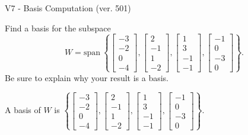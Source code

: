 \begin{exercise}
  \begin{exerciseTitle}V7 - Basis Computation (ver. 501)\end{exerciseTitle}
  \begin{exerciseStatement}
    Find a basis for the subspace 
\[W=\mathrm{span}\ \left\{\left[\begin{array}{r}
-3 \\
-2 \\
0 \\
-4
\end{array}\right] , \left[\begin{array}{r}
2 \\
-1 \\
1 \\
-2
\end{array}\right] , \left[\begin{array}{r}
1 \\
3 \\
-1 \\
-1
\end{array}\right] , \left[\begin{array}{r}
-1 \\
0 \\
-3 \\
0
\end{array}\right]\right\}.\]
 Be sure to explain why your result is a basis.


  \end{exerciseStatement}
  \begin{exerciseAnswer}
   A basis of \(W\) is  \(\left\{\left[\begin{array}{r}
-3 \\
-2 \\
0 \\
-4
\end{array}\right] , \left[\begin{array}{r}
2 \\
-1 \\
1 \\
-2
\end{array}\right] , \left[\begin{array}{r}
1 \\
3 \\
-1 \\
-1
\end{array}\right] , \left[\begin{array}{r}
-1 \\
0 \\
-3 \\
0
\end{array}\right]\right\}\).
  


  \end{exerciseAnswer}
\end{exercise}